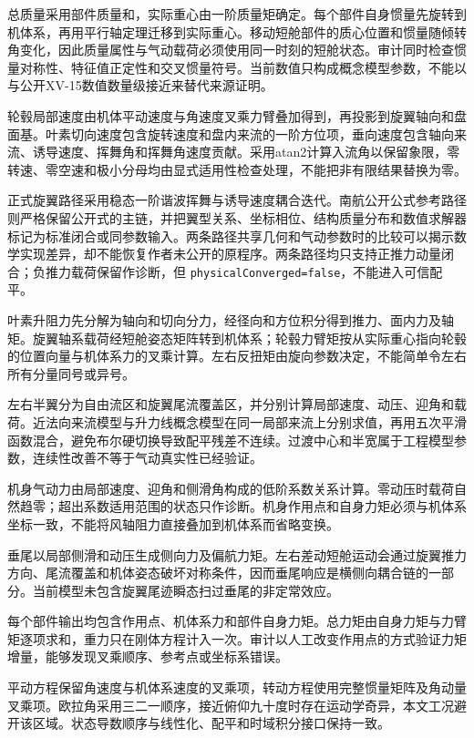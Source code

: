 \documentclass[UTF8,11pt,oneside,openany,fontset=windows]{ctexbook}
\begin{document}
总质量采用部件质量和，实际重心由一阶质量矩确定。每个部件自身惯量先旋转到机体系，再用平行轴定理迁移到实际重心。移动短舱部件的质心位置和惯量随倾转角变化，因此质量属性与气动载荷必须使用同一时刻的短舱状态。审计同时检查惯量对称性、特征值正定性和交叉惯量符号。当前数值只构成概念模型参数，不能以与公开XV-15数值数量级接近来替代来源证明。

轮毂局部速度由机体平动速度与角速度叉乘力臂叠加得到，再投影到旋翼轴向和盘面基。叶素切向速度包含旋转速度和盘内来流的一阶方位项，垂向速度包含轴向来流、诱导速度、挥舞角和挥舞角速度贡献。采用atan2计算入流角以保留象限，零转速、零空速和极小分母均由显式适用性检查处理，不能把非有限结果替换为零。

正式旋翼路径采用稳态一阶谐波挥舞与诱导速度耦合迭代。南航公开公式参考路径则严格保留公开式的主链，并把翼型关系、坐标相位、结构质量分布和数值求解器标记为标准闭合或同参数输入。两条路径共享几何和气动参数时的比较可以揭示数学实现差异，却不能恢复作者未公开的原程序。两条路径均只支持正推力动量闭合；负推力载荷保留作诊断，但
\texttt{physicalConverged=false}，不能进入可信配平。

叶素升阻力先分解为轴向和切向分力，经径向和方位积分得到推力、面内力及轴矩。旋翼轴系载荷经短舱姿态矩阵转到机体系；轮毂力臂矩按从实际重心指向轮毂的位置向量与机体系力的叉乘计算。左右反扭矩由旋向参数决定，不能简单令左右所有分量同号或异号。

左右半翼分为自由流区和旋翼尾流覆盖区，并分别计算局部速度、动压、迎角和载荷。近法向来流模型与升力线概念模型在同一局部来流上分别求值，再用五次平滑函数混合，避免布尔硬切换导致配平残差不连续。过渡中心和半宽属于工程模型参数，连续性改善不等于气动真实性已经验证。

机身气动力由局部速度、迎角和侧滑角构成的低阶系数关系计算。零动压时载荷自然趋零；超出系数适用范围的状态只作诊断。机身作用点和自身力矩必须与机体系坐标一致，不能将风轴阻力直接叠加到机体系而省略变换。

垂尾以局部侧滑和动压生成侧向力及偏航力矩。左右差动短舱运动会通过旋翼推力方向、尾流覆盖和机体姿态破坏对称条件，因而垂尾响应是横侧向耦合链的一部分。当前模型未包含旋翼尾迹瞬态扫过垂尾的非定常效应。

每个部件输出均包含作用点、机体系力和部件自身力矩。总力矩由自身力矩与力臂矩逐项求和，重力只在刚体方程计入一次。审计以人工改变作用点的方式验证力矩增量，能够发现叉乘顺序、参考点或坐标系错误。

平动方程保留角速度与机体系速度的叉乘项，转动方程使用完整惯量矩阵及角动量叉乘项。欧拉角采用三二一顺序，接近俯仰九十度时存在运动学奇异，本文工况避开该区域。状态导数顺序与线性化、配平和时域积分接口保持一致。
\end{document}
